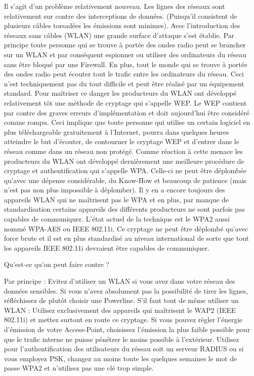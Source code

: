 Il s'agit d'un problème relativement nouveau. Les lignes des réseaux sont relativement sur contre des interceptions de données. (Puisqu'il consistent de plusieurs câbles torsadées les émissions sont minimes). Avec l'introduction des réseaux sans câbles (WLAN) une grande surface d'attaque s'est établie. Par principe toute personne qui se trouve à portée des ondes radio peut se brancher sur un WLAN et par conséquent espionner ou utiliser des ordinateurs du réseau sans être bloqué par une Firewall. En plus, tout le monde qui se trouve à portée des ondes radio peut écouter tout le trafic entre les ordinateurs du réseau. Ceci n'est techniquement pas du tout difficile et peut être réalisé par un équipement standard. Pour maîtriser ce danger les producteurs du WLAN ont développé relativement tôt une méthode de cryptage qui s'appelle WEP. Le WEP contient par contre des graves erreurs d'implémentation et doit aujourd'hui être considéré comme rompu. Ceci implique que toute personne qui utilise un certain logiciel en plus téléchargeable gratuitement à l'Internet, pourra dans quelques heures atteindre le but d'écouter, de contourner le cryptage WEP et d'entrer dans le réseau comme dans un réseau non protégé. Comme réaction à cette menace les producteurs du WLAN ont développé dernièrement une meilleure procédure de cryptage et authentification qui s'appelle WPA. Celle-ci ne peut être déplombée qu'avec une dépense considérable, du Know-How et beaucoup de patience (mais n'est pas non plus impossible à déplomber).
Il y en a encore toujours des appareils WLAN qui ne maîtrisent pas le WPA et en plus, par manque de standardisation certains appareils des différents producteurs ne sont parfois pas capables de communiquer. L'état actuel de la technique est le WPA2 aussi nommé WPA-AES ou IEEE 802.11i. Ce cryptage ne peut être déplombé qu'avec force brute et il est en plus standardisé au niveau international de sorte que tout les appareils IEEE 802.11i devraient être capables de communiquer.


\medskip
Qu'est-ce qu'on peut faire contre ?

Par principe : Evitez d'utiliser un WLAN si vous avez dans votre réseau des données sensibles. Si vous n'avez absolument pas la possibilité de tirer les lignes, réfléchissez de plutôt choisir une Powerline. S'il faut tout de même utiliser un WLAN : Utilisez exclusivement des appareils qui maîtrisent le WAP2 (IEEE 802.11i) et mettez surtout en route ce cryptage. Si vous pouvez régler l'énergie d'émission de votre Access-Point, choisissez l'émission la plus faible possible pour que le trafic interne ne puisse pénétrer le moins possible à l'extérieur. Utilisez pour l'authentification des utilisateurs du réseau soit un serveur RADIUS ou si vous employez PSK, changez au moins toute les quelques semaines le mot de passe WPA2 et n'utilisez pas une clé trop simple.

